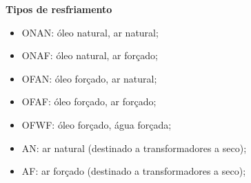 \textbf{Tipos de resfriamento}

\begin{itemize}
    \item ONAN: óleo natural, ar natural;
    \item ONAF: óleo natural, ar forçado;
    \item OFAN: óleo forçado, ar natural;
    \item OFAF: óleo forçado, ar forçado;
    \item OFWF: óleo forçado, água forçada;
    \item AN: ar natural (destinado a transformadores a seco);
    \item AF: ar forçado (destinado a transformadores a seco);
\end{itemize}